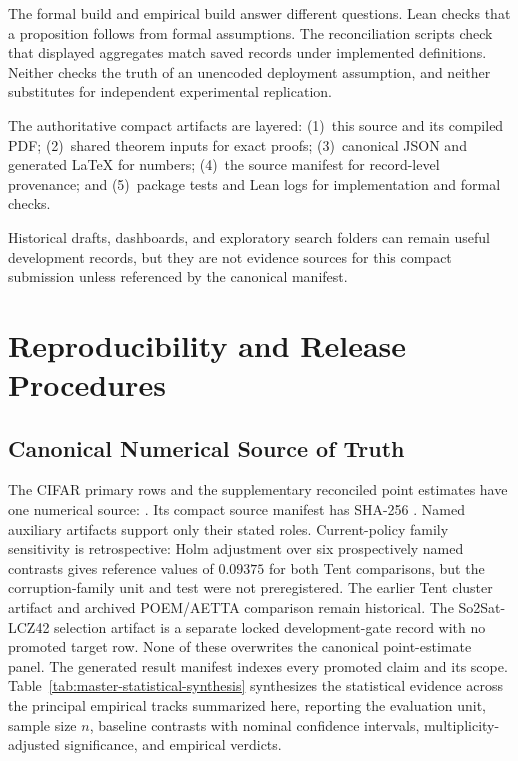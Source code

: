 The formal build and empirical build answer different questions. Lean checks that a proposition
follows from formal assumptions. The reconciliation scripts check that displayed aggregates match
saved records under implemented definitions. Neither checks the truth of an unencoded deployment
assumption, and neither substitutes for independent experimental replication.

The authoritative compact artifacts are layered: (1)~this source and its compiled PDF; (2)~shared theorem inputs for exact proofs; (3)~canonical JSON and generated LaTeX for numbers; (4)~the source manifest for record-level provenance; and (5)~package tests and Lean logs for implementation and formal checks.

Historical drafts, dashboards, and exploratory search folders can remain useful development
records, but they are not evidence sources for this compact submission unless referenced by the
canonical manifest.

\section{Reproducibility and Release Procedures}
\label{sec:compact-repro}

\subsection{Canonical Numerical Source of Truth}

The CIFAR primary rows and the supplementary reconciled point estimates have one numerical source:
. Its compact
source manifest has SHA-256 \hashtext{\SourceManifestSHA}. Named auxiliary artifacts support only
their stated roles. Current-policy family sensitivity is retrospective: Holm adjustment over six
prospectively named contrasts gives reference values of $0.09375$ for both Tent comparisons, but
the corruption-family unit and test were not preregistered. The earlier Tent cluster artifact and
archived POEM/AETTA comparison remain historical. The So2Sat-LCZ42 selection artifact is a separate locked
development-gate record with no promoted target row. None of these overwrites the canonical
point-estimate panel. The generated result manifest indexes every promoted claim and its scope. Table~\ref{tab:master-statistical-synthesis} synthesizes the statistical evidence across the principal empirical tracks summarized here, reporting the evaluation unit, sample size $n$, baseline contrasts with nominal confidence intervals, multiplicity-adjusted significance, and empirical verdicts.

